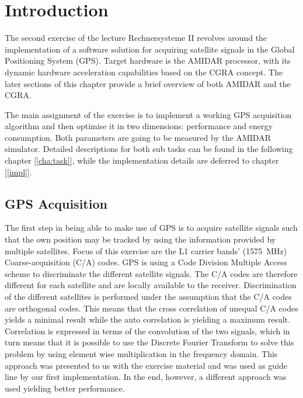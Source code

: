 \chapter{Introduction}
\label{cha:intro}
	The second exercise of the lecture Rechnersysteme II revolves around the implementation of a software solution for acquiring satellite signals in the Global Positioning System (GPS). Target hardware is the AMIDAR processor, with its dynamic hardware acceleration capabilities based on the CGRA concept. The later sections of this chapter provide a brief overview of both AMIDAR and the CGRA.

	The main assignment of the exercise is to implement a working GPS acquisition algorithm and then optimise it in two dimensions: performance and energy consumption. Both parameters are going to be measured by the AMIDAR simulator. Detailed descriptions for both sub tasks can be found in the following chapter [\ref{cha:task}], while the implementation details are deferred to chapter [\ref{impl}].

	\section{GPS Acquisition} %
	\label{sec:intro_acq}
		The first step in being able to make use of GPS is to acquire satellite signals such that the own position may be tracked by using the information provided by multiple satellites.
		Focus of this exercise are the L1 carrier bands' (\SI{1575}{\mega\hertz}) Coarse-acquisition (C/A) codes. GPS is using a Code Division Multiple Access scheme to discriminate the different satellite signals. The C/A codes are therefore different for each satellite and are locally available to the receiver. 
		Discrimination of the different satellites is performed under the assumption that the C/A codes are orthogonal codes. This means that the cross correlation of unequal C/A codes yields a minimal result while the auto correlation is yielding a maximum result. Correlation is expressed in terms of the convolution of the two signals, which in turn means that it is possible to use the Discrete Fourier Transform to solve this problem by using element wise multiplication in the frequency domain. This approach was presented to us with the exercise material and was used as guide line by our first implementation. In the end, however, a different approach was used yielding better performance. 


